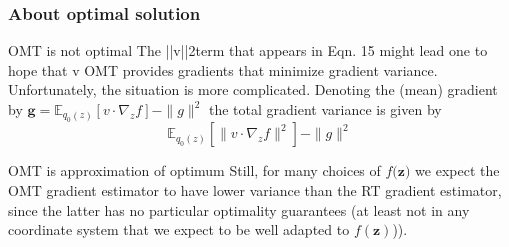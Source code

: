\documentclass{beamer}
\begin{document}
\begin{frame}
    \frametitle{About optimal solution}
    \begin{block}{OMT is not optimal}
    The ||v||2term that appears in Eqn. 15 might lead one to hope that v OMT provides gradients that minimize gradient variance. Unfortunately, the situation is more complicated. Denoting the (mean) gradient by $\mathbf{g} = \mathbb{E}_{q_0(z)} \left[ v \cdot \nabla_z f \right] - \| g \|^2$ the total gradient variance is given by
    $$ \mathbb{E}_{q_0(z)} \left[ \| v \cdot \nabla_z f \|^2 \right] - \| g \|^2$$
    \end{block}

    \begin{block}{OMT is approximation of optimum}
    Still, for many choices of $f\mathbf{(z})$ we expect the
OMT gradient estimator to have lower variance than the RT gradient estimator, since the latter has no particular optimality guarantees (at least not in any coordinate system that we
expect to be well adapted to $f(\mathbf{z})$)).
    \end{block}

\end{frame}
\end{document}
